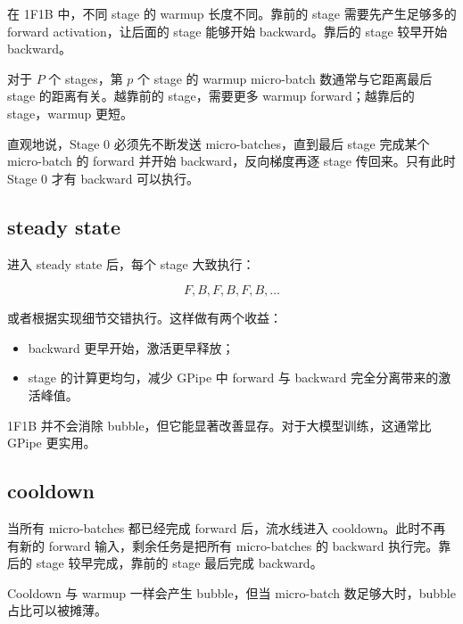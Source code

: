 在 1F1B 中，不同 stage 的 warmup 长度不同。靠前的 stage 需要先产生足够多的 forward activation，让后面的 stage 能够开始 backward。靠后的 stage 较早开始 backward。

对于 $P$ 个 stages，第 $p$ 个 stage 的 warmup micro-batch 数通常与它距离最后 stage 的距离有关。越靠前的 stage，需要更多 warmup forward；越靠后的 stage，warmup 更短。

直观地说，Stage 0 必须先不断发送 micro-batches，直到最后 stage 完成某个 micro-batch 的 forward 并开始 backward，反向梯度再逐 stage 传回来。只有此时 Stage 0 才有 backward 可以执行。

\subsection{steady state}
\label{subsec:onef1b-steady-state}

进入 steady state 后，每个 stage 大致执行：

\[
F, B, F, B, F, B,\ldots
\]

或者根据实现细节交错执行。这样做有两个收益：

\begin{itemize}
\item backward 更早开始，激活更早释放；
\item stage 的计算更均匀，减少 GPipe 中 forward 与 backward 完全分离带来的激活峰值。
\end{itemize}

1F1B 并不会消除 bubble，但它能显著改善显存。对于大模型训练，这通常比 GPipe 更实用。

\subsection{cooldown}
\label{subsec:onef1b-cooldown}

当所有 micro-batches 都已经完成 forward 后，流水线进入 cooldown。此时不再有新的 forward 输入，剩余任务是把所有 micro-batches 的 backward 执行完。靠后的 stage 较早完成，靠前的 stage 最后完成 backward。

Cooldown 与 warmup 一样会产生 bubble，但当 micro-batch 数足够大时，bubble 占比可以被摊薄。

